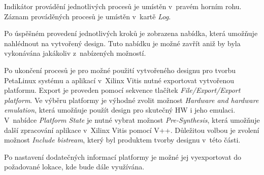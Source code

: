 \documentclass[a4paper, twoside, 11pt]{article}
\begin{document}
\begin{appendices}
		Indikátor provádění jednotlivých procesů je umístěn v~pravém horním rohu. Záznam prováděných procesů je umístěn v~kartě \textit{Log}.\par
		Po úspěšném provedení jednotlivých kroků je zobrazena nabídka, která umožňuje nahlédnout na vytvořený design. Tuto nabídku je možné zavřít aniž by byla vykonávána jakákoliv z~nabízených možností.\par
		Po ukončení procesů je pro možné použití vytvořeného designu pro tvorbu PetaLinux systému a aplikací v~Xilinx Vitis nutné exportovat vytvořenou platformu. Export je proveden pomocí sekvence tlačítek \textit{File/Export/Export platform}. Ve výběru platformy je výhodné zvolit možnost \textit{Hardware and hardware emulation}, která umožňuje použít design pro skutečný HW i jeho emulaci. V~nabídce \textit{Platform State} je nutné vybrat možnost \textit{Pre-Synthesis}, která umožňuje další zpracování aplikace v~Xilinx Vitis pomocí V++. Důležitou volbou je zvolení možnost \textit{Include bistream}, který byl produktem tvorby designu v~této části.\par
		Po nastavení dodatečných informací platformy je možné jej vyexportovat do požadované lokace, kde bude dále využívána.
	\end{appendices}
\end{document}

